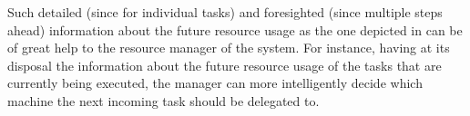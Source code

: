 Such detailed (since for individual tasks) and foresighted (since multiple steps
ahead) information about the future resource usage as the one depicted in
 can be of great help to the resource manager of the
system. For instance, having at its disposal the information about the future
resource usage of the tasks that are currently being executed, the manager can
more intelligently decide which machine the next incoming task should be
delegated to.
